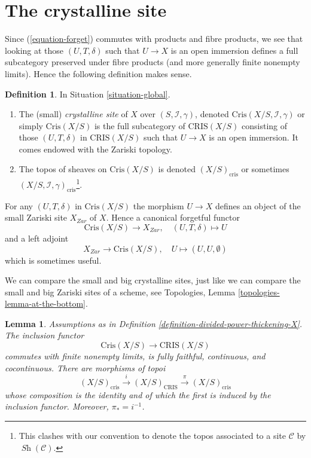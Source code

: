 \documentclass{stacks-project}
\theoremstyle{plain}
\newtheorem{lemma}[subsection]{Lemma}
\theoremstyle{definition}
\newtheorem{definition}[subsection]{Definition}
\theoremstyle{remark}
\numberwithin{equation}{subsection}
\def\Sh{\mathop{\mathit{Sh}}\nolimits}
\begin{document}
\section{The crystalline site}
\label{section-site}

\noindent
Since (\ref{equation-forget}) commutes with products and fibre
products, we see that looking at those $(U, T, \delta)$ such that
$U \to X$ is an open immersion defines a full
subcategory preserved under fibre products (and more generally
finite nonempty limits). Hence the following
definition makes sense.

\begin{definition}
\label{definition-crystalline-site}
In Situation \ref{situation-global}.
\begin{enumerate}
\item The (small) {\it crystalline site} of $X$ over
$(S, \mathcal{I}, \gamma)$, denoted $\text{Cris}(X/S, \mathcal{I}, \gamma)$
or simply $\text{Cris}(X/S)$ is the full subcategory of $\text{CRIS}(X/S)$
consisting of those $(U, T, \delta)$ in $\text{CRIS}(X/S)$ such that
$U \to X$ is an open immersion. It comes endowed with the Zariski topology.
\item The topos of sheaves on $\text{Cris}(X/S)$ is denoted
$(X/S)_{\text{cris}}$ or sometimes
$(X/S, \mathcal{I}, \gamma)_{\text{cris}}$\footnote{This clashes with
our convention to denote the topos associated to a site $\mathcal{C}$
by $\Sh(\mathcal{C})$.}.
\end{enumerate}
\end{definition}

\noindent
For any $(U, T, \delta)$ in $\text{Cris}(X/S)$ the morphism $U \to X$
defines an object of the small Zariski site $X_{Zar}$ of $X$. Hence
a canonical forgetful functor
\begin{equation}
\label{equation-forget-small}
\text{Cris}(X/S) \longrightarrow X_{Zar},\quad
(U, T, \delta) \longmapsto U
\end{equation}
and a left adjoint
\begin{equation}
\label{equation-endow-trivial-small}
X_{Zar} \longrightarrow \text{Cris}(X/S),\quad
U \longmapsto (U, U, \emptyset)
\end{equation}
which is sometimes useful.

\medskip\noindent
We can compare the small and big crystalline sites, just like
we can compare the small and big Zariski sites of a scheme, see
Topologies, Lemma \ref{topologies-lemma-at-the-bottom}.

\begin{lemma}
\label{lemma-compare-big-small}
Assumptions as in Definition \ref{definition-divided-power-thickening-X}.
The inclusion functor
$$
\text{Cris}(X/S) \to \text{CRIS}(X/S)
$$
commutes with finite nonempty limits, is fully faithful, continuous,
and cocontinuous. There are morphisms of topoi
$$
(X/S)_{\text{cris}} \xrightarrow{i} (X/S)_{\text{CRIS}}
\xrightarrow{\pi} (X/S)_{\text{cris}}
$$
whose composition is the identity and of which the first is induced
by the inclusion functor. Moreover, $\pi_* = i^{-1}$.
\end{lemma}
\end{document}
